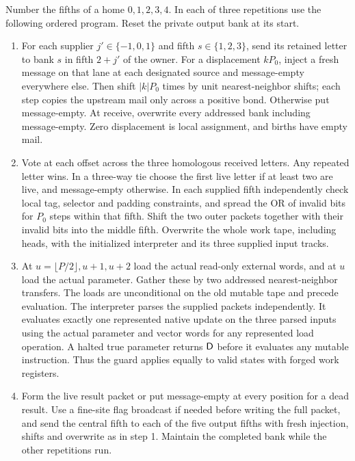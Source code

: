 Number the fifths of a home \(0,1,2,3,4\). In each of three repetitions use the following ordered program. Reset the private output bank at its start.
\begin{enumerate}
\item For each supplier \(j'\in\{-1,0,1\}\) and fifth \(s\in\{1,2,3\}\), send its retained letter to bank \(s\) in fifth \(2+j'\) of the owner. For a displacement \(kP_0\), inject a fresh message on that lane at each designated source and message-empty everywhere else. Then shift \(|k|P_0\) times by unit nearest-neighbor shifts; each step copies the upstream mail only across a positive bond. Otherwise put message-empty. At receive, overwrite every addressed bank including message-empty. Zero displacement is local assignment, and births have empty mail.
\item Vote at each offset across the three homologous received letters. Any repeated letter wins. In a three-way tie choose the first live letter if at least two are live, and message-empty otherwise. In each supplied fifth independently check local tag, selector and padding constraints, and spread the OR of invalid bits for \(P_0\) steps within that fifth. Shift the two outer packets together with their invalid bits into the middle fifth. Overwrite the whole work tape, including heads, with the initialized interpreter and its three supplied input tracks.
\item At \(u=\lfloor P/2\rfloor,u+1,u+2\) load the actual read-only external words, and at \(u\) load the actual parameter. Gather these by two addressed nearest-neighbor transfers. The loads are unconditional on the old mutable tape and precede evaluation. The interpreter parses the supplied packets independently. It evaluates exactly one represented native update on the three parsed inputs using the actual parameter and vector words for any represented load operation. A halted true parameter returns \(\mathsf D\) before it evaluates any mutable instruction. Thus the guard applies equally to valid states with forged work registers.
\item Form the live result packet or put message-empty at every position for a dead result. Use a fine-site flag broadcast if needed before writing the full packet, and send the central fifth to each of the five output fifths with fresh injection, shifts and overwrite as in step 1. Maintain the completed bank while the other repetitions run.
\end{enumerate}

